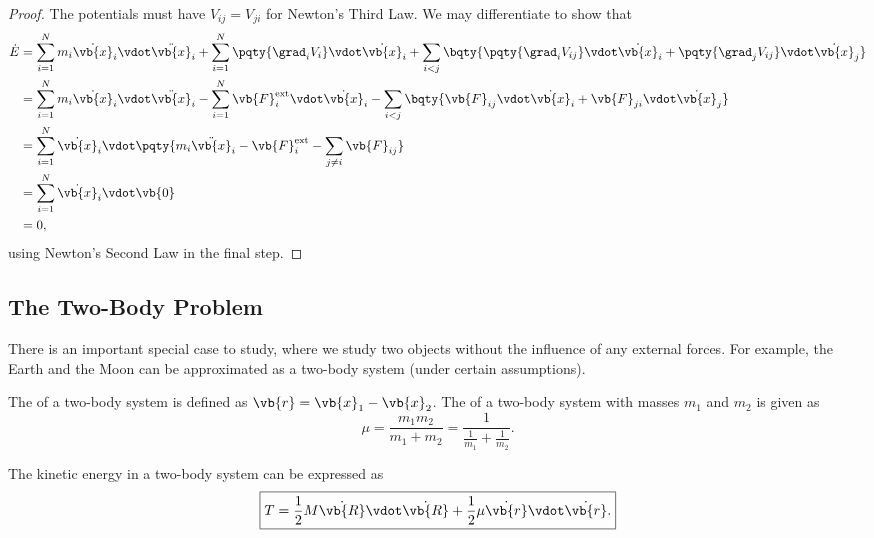 \begin{proof}
    The potentials must have \(V_{ij} = V_{ji}\) for Newton's Third Law. We may differentiate to show that
    \begin{subequations}\begin{align}
        \dot{E} &= \sum_{i = 1}^{N} m_i \dot{\vb{x}}_i \vdot \ddot{\vb{x}}_i + \sum_{i = 1}^{N} \pqty{\grad_i V_i} \vdot \dot{\vb{x}}_i + \sum_{i < j} \bqty{\pqty{\grad_i V_{ij}} \vdot \dot{\vb{x}}_i + \pqty{\grad_j V_{ij}} \vdot \dot{\vb{x}}_j} \\
        &= \sum_{i = 1}^{N} m_i \dot{\vb{x}}_i \vdot \ddot{\vb{x}}_i - \sum_{i = 1}^{N} \vb{F}_i^{\text{ext}} \vdot \dot{\vb{x}}_i - \sum_{i < j} \bqty{\vb{F}_{ij} \vdot \dot{\vb{x}}_i + \vb{F}_{ji} \vdot \dot{\vb{x}}_j} \\
        &= \sum_{i = 1}^{N} \dot{\vb{x}}_i \vdot \pqty{m_i \ddot{\vb{x}}_i - \vb{F}_i^{\text{ext}} - \sum_{j \neq i} \vb{F}_{ij}} \\
        &= \sum_{i = 1}^{N} \dot{\vb{x}}_i \vdot \vb{0} \\
        &= 0,
    \end{align}\end{subequations}
    using Newton's Second Law in the final step.
\end{proof}

\subsection{The Two-Body Problem}

There is an important special case to study, where we study two objects without the influence of any external forces. For example, the Earth and the Moon can be approximated as a two-body system (under certain assumptions).

\begin{definition}
    \label{def:relative-separation-reduced-mass}%
    The  of a two-body system is defined as \(\vb{r} = \vb{x}_1 - \vb{x}_2\). The  of a two-body system with masses \(m_1\) and \(m_2\) is given as
    \begin{equation}
        \boxed{\mu = \frac{m_1 m_2}{m_1 + m_2} = \frac{1}{\frac{1}{m_1} + \frac{1}{m_2}}.}
    \end{equation}
\end{definition}

\begin{proposition}
    The kinetic energy in a two-body system can be expressed as
    \begin{equation}
        \boxed{T = \frac{1}{2} M \dot{\vb{R}} \vdot \dot{\vb{R}} + \frac{1}{2} \mu \dot{\vb{r}} \vdot \dot{\vb{r}}.}
    \end{equation}
\end{proposition}

